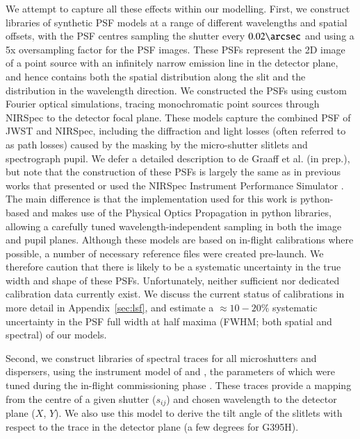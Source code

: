 \documentclass[longauth]{aa}
\begin{document}
We attempt to capture all these effects within our modelling. First, we construct libraries of synthetic PSF models at a range of different wavelengths and spatial offsets, with the PSF centres sampling the shutter every $0.02\arcsec$ and using a 5x oversampling factor for the PSF images. These PSFs represent the 2D image of a point source with an infinitely narrow emission line in the detector plane, and hence contains both the spatial distribution along the slit and the distribution in the wavelength direction. We constructed the PSFs using custom Fourier optical simulations, tracing monochromatic point sources through NIRSpec to the detector focal plane. These models capture the combined PSF of JWST and NIRSpec, including the diffraction and  light losses (often referred to as path losses) caused by the masking by the micro-shutter slitlets and spectrograph pupil. We defer a detailed description to de Graaff et al. (in prep.), but note that the construction of these PSFs is largely the same as in previous works that presented or used the NIRSpec Instrument Performance Simulator \citep{Piqueras2008,Piqueras2010,Giardino2019,Jakobsen2022}. The main difference is that the implementation used for this work is python-based and makes use of the Physical Optics Propagation in python \citep[POPPY;][]{Perrin2012} libraries, allowing a carefully tuned wavelength-independent sampling in both the image and pupil planes. Although these models are based on in-flight calibrations where possible, a number of necessary reference files were created pre-launch. {We therefore caution that there is likely to be a systematic uncertainty in the true width and shape of these PSFs. Unfortunately, neither sufficient nor dedicated calibration data currently exist. We discuss the current status of calibrations in more detail in Appendix~\ref{sec:lsf}, and estimate a $\approx10-20\%$ systematic uncertainty in the PSF full width at half maxima (FWHM; both spatial and spectral) of our models. }



Second, we construct libraries of spectral traces for all microshutters and dispersers, using the instrument model of \citet{Dorner2016} and \citet{Giardino2016}, the parameters of which were tuned during the in-flight commissioning phase \citep{Luetzgendorf2022,Alves2022}. These traces provide a mapping from the centre of a given shutter ($s_{ij}$) and chosen wavelength to the detector plane ($X$, $Y$). We also use this model to derive the tilt angle of the slitlets with respect to the trace in the detector plane  (a few degrees for G395H).
\end{document}
